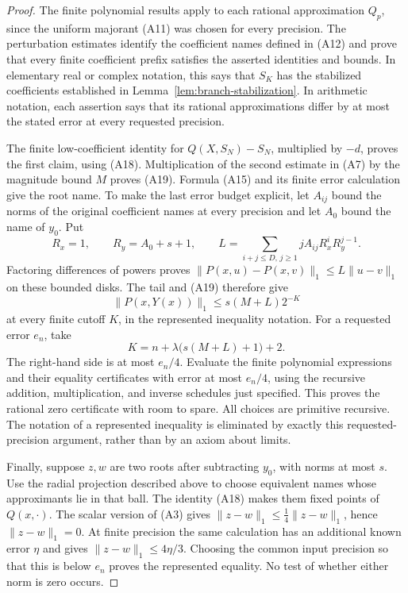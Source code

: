 \begin{proof}
The finite polynomial results apply to each rational approximation
\(Q_p\), since the uniform majorant (A11) was chosen for every
precision. The perturbation estimates identify the coefficient names
defined in (A12) and prove that every finite coefficient prefix satisfies
the asserted identities and bounds. In elementary real or complex
notation, this says that \(S_K\) has the stabilized coefficients
established in Lemma~\ref{lem:branch-stabilization}. In arithmetic
notation, each assertion says that its rational approximations differ
by at most the stated error at every requested precision.

The finite low-coefficient identity for \(Q(X,S_N)-S_N\), multiplied
by \(-d\), proves the first claim, using (A18). Multiplication of
the second estimate in (A7) by the magnitude bound \(M\) proves
(A19). Formula (A15) and its finite error calculation give the root
name. To make the last error budget explicit, let \(A_{ij}\) bound
the norms of the original coefficient names at every precision and
let \(A_0\) bound the name of \(y_0\). Put
\[
 R_x=1,\qquad R_y=A_0+s+1,\qquad
 L=\sum_{i+j\leq D,\,j\geq1}
       jA_{ij}R_x^iR_y^{j-1}.
\]
Factoring differences of powers proves
\(\lVert P(x,u)-P(x,v)\rVert_1\leq L\lVert u-v\rVert_1\)
on these bounded disks. The tail and (A19) therefore give
\[
 \lVert P(x,Y(x))\rVert_1\leq s(M+L)2^{-K}
\]
at every finite cutoff \(K\), in the represented inequality
notation. For a requested error \(e_n\), take
\[
 K=n+\lambda\bigl(s(M+L)+1\bigr)+2.
 \tag{A19a}\label{eq:final-zero-budget}
\]
The right-hand side is at most \(e_n/4\). Evaluate the finite
polynomial expressions and their equality certificates with error at
most \(e_n/4\), using the recursive addition, multiplication, and
inverse schedules just specified. This proves the rational zero
certificate with room to spare. All choices are primitive recursive.
The notation of a represented inequality is eliminated by exactly this
requested-precision argument, rather than by an axiom about limits.

Finally, suppose \(z,w\) are two roots after subtracting \(y_0\),
with norms at most \(s\). Use the radial projection described above
to choose equivalent names whose approximants lie in that ball.
The identity (A18) makes them fixed points
of \(Q(x,\cdot)\). The scalar version of (A3) gives
\(\lVert z-w\rVert_1\leq\frac14\lVert z-w\rVert_1\), hence
\(\lVert z-w\rVert_1=0\). At finite precision the same calculation
has an additional known error \(\eta\) and gives
\(\lVert z-w\rVert_1\leq4\eta/3\). Choosing the common input
precision so that this is below \(e_n\) proves the represented
equality. No test of whether either norm is zero occurs.
\end{proof}

